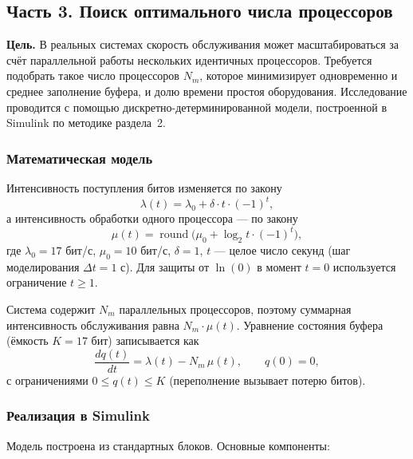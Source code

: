 \documentclass[a4paper,12pt]{article}
\begin{document}
\subsection*{Часть 3. Поиск оптимального числа процессоров}

\textbf{Цель.}  
В реальных системах скорость обслуживания может масштабироваться за счёт
параллельной работы нескольких идентичных процессоров. Требуется подобрать
такое число процессоров \(N_m\), которое минимизирует одновременно и среднее
заполнение буфера, и долю времени простоя оборудования. Исследование проводится
с помощью дискретно-детерминированной модели, построенной в Simulink по методике
раздела~2.

\subsubsection*{Математическая модель}

Интенсивность поступления битов изменяется по закону
\[
\lambda(t) = \lambda_0 + \delta \cdot t \cdot (-1)^t,
\]
а интенсивность обработки одного процессора — по закону
\[
\mu(t) = \operatorname{round}\!\bigl(\mu_0 + \log_2 t \cdot (-1)^t\bigr),
\]
где \(\lambda_0 = 17\) бит/с, \(\mu_0 = 10\) бит/с, \(\delta = 1\), \(t\) — целое
число секунд (шаг моделирования \(\Delta t = 1\) с). Для защиты от \(\ln(0)\) в
момент \(t = 0\) используется ограничение \(t \geqslant 1\).

Система содержит \(N_m\) параллельных процессоров, поэтому суммарная
интенсивность обслуживания равна \(N_m \cdot \mu(t)\). Уравнение состояния
буфера (ёмкость \(K = 17\) бит) записывается как
\[
\frac{dq(t)}{dt} = \lambda(t) - N_m\,\mu(t),\qquad q(0)=0,
\]
с ограничениями \(0 \leqslant q(t) \leqslant K\) (переполнение вызывает потерю
битов).

\subsubsection*{Реализация в Simulink}

Модель построена из стандартных блоков. Основные компоненты:
\end{document}
